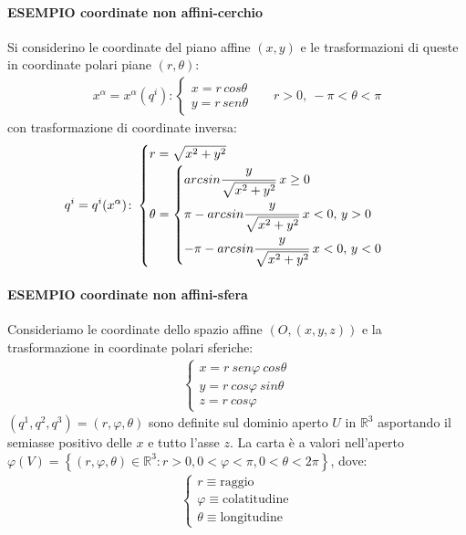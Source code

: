 \paragraph{ESEMPIO coordinate non affini-cerchio}
Si considerino le coordinate del piano affine $(x,y)$ e le trasformazioni di queste in coordinate polari piane $(r,\theta)$:
\begin{align*}
x^\alpha=x^\alpha(q^i)\colon\begin{cases}
    x=r\,cos\theta\\
    y=r\,sen\theta
    \end{cases} &&r>0,\: -\pi<\theta<\pi
\end{align*}%
con trasformazione di coordinate inversa:
\begin{align*}
q^i=q^i(x^\alpha)\colon \begin{cases}
r=\sqrt{x^2+y^2}\\
\theta=\begin{cases}
arcsin\cfrac{y}{\sqrt{x^2+y^2}}\;x\ge 0 \\
\pi-arcsin\cfrac{y}{\sqrt{x^2+y^2}}\; x<0,\,y>0\\
-\pi-arcsin\cfrac{y}{\sqrt{x^2+y^2}}\;x<0,\,y<0
\end{cases}
    \end{cases}
\end{align*}
\paragraph{ESEMPIO coordinate non affini-sfera} Consideriamo le coordinate dello spazio affine $(O,(x,y,z))$ e la trasformazione in coordinate polari sferiche:
\begin{align*}
\begin{cases}
x=r\:sen\varphi\:cos\theta\\
y=r\:cos\varphi\:sin\theta\\
 z=r\:cos\varphi
    \end{cases}
\end{align*}
$(q^1,q^2,q^3)=(r,\varphi,\theta)$ sono definite sul dominio aperto $U$ in $\mathbb{R}^3$ asportando il semiasse positivo delle $x$ e tutto l'asse $z$. La carta è a valori nell'aperto $\varphi(V)=\left\{(r,\varphi,\theta)\in \mathbb{R}^3\colon r>0, 0<\varphi<\pi, 0<\theta<2\pi\right\}$, dove:
\begin{align*}
    \begin{cases}
        r\equiv\text{raggio}\\
        \varphi\equiv\text{colatitudine}\\
        \theta\equiv \text{longitudine}
    \end{cases}
\end{align*}
